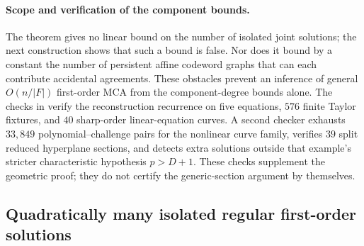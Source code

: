 \paragraph{Scope and verification of the component bounds.}
The theorem gives no linear bound on the number of isolated joint
solutions; the next construction shows that such a bound is false.
Nor does it bound by a constant the number of persistent
affine codeword graphs that can each contribute accidental agreements.
These obstacles prevent an inference of general $O(n/|F|)$ first-order
MCA from the component-degree bounds alone.
The checks in  verify
the reconstruction recurrence on five equations, $576$ finite Taylor
fixtures, and $40$ sharp-order linear-equation curves. A second checker
exhausts $33{,}849$ polynomial--challenge pairs for the nonlinear
curve family, verifies $39$ split reduced hyperplane sections, and
detects extra solutions outside that example's stricter characteristic
hypothesis $p>D+1$.
These checks supplement the geometric proof; they do not certify
the generic-section argument by themselves.

\subsection{Quadratically many isolated regular first-order solutions}
\label{sec:quadratic-isolated-first-order}

